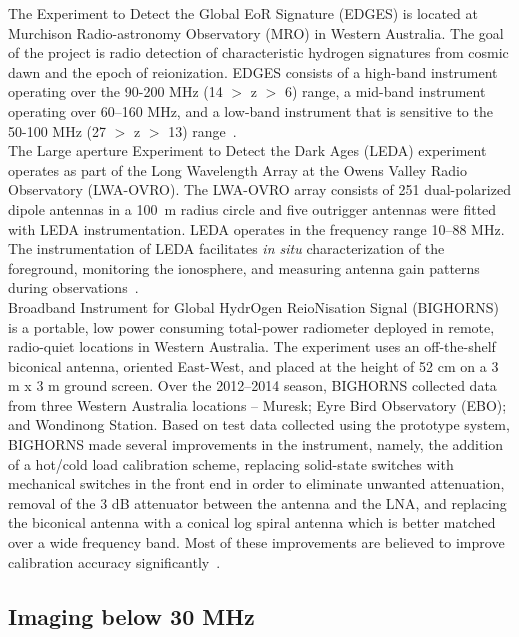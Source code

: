 	    The Experiment to Detect the Global EoR Signature (EDGES) is located at Murchison Radio-astronomy Observatory (MRO) in Western Australia. The goal of the project is radio detection of characteristic hydrogen signatures from cosmic dawn and the epoch of reionization. EDGES consists of a high-band instrument operating over the 90-200 MHz (14 $>$ z $>$ 6) range, a mid-band instrument operating over 60–160 MHz, and a low-band instrument that is sensitive to the 50-100 MHz (27 $>$ z $>$ 13) range~\cite{2017ApJ...835...49M}.\\
	    
	    The Large aperture Experiment to Detect the Dark Ages (LEDA) experiment operates as part of the Long Wavelength Array at the Owens Valley Radio Observatory (LWA-OVRO). The LWA-OVRO array consists of 251 dual-polarized dipole antennas in a \SI{100}{\meter} radius circle and five outrigger antennas were fitted with LEDA instrumentation. LEDA operates in the frequency range 10–88 MHz. The instrumentation of LEDA facilitates \textit{in situ} characterization of the foreground, monitoring the ionosphere, and measuring antenna gain patterns during observations~\citep{2012JAI.....150004T, 2018MNRAS.478.4193P}.\\
	    
	    Broadband Instrument for Global HydrOgen ReioNisation Signal
	    (BIGHORNS) is a portable, low power consuming total-power radiometer deployed in remote, radio-quiet locations in Western Australia. The experiment uses an off-the-shelf biconical antenna, oriented East-West, and placed at the height of 52 cm on a 3 m x 3 m ground screen. Over the 2012–2014 season, BIGHORNS collected data from three Western Australia locations – Muresk; Eyre Bird Observatory (EBO); and Wondinong Station. Based on test data collected using the prototype system, BIGHORNS made several improvements in the instrument, namely, the addition of a hot/cold load calibration scheme, replacing solid-state switches with mechanical switches in the front end in order to eliminate unwanted attenuation, removal of the 3 dB attenuator between the antenna and the LNA, and replacing the biconical antenna with a conical log spiral antenna which is better matched over a wide frequency band. Most of these improvements are believed to improve calibration accuracy significantly~\citep{2015PASA...32....4S}.
	    
	    \subsection{Imaging below 30 MHz}
	    
